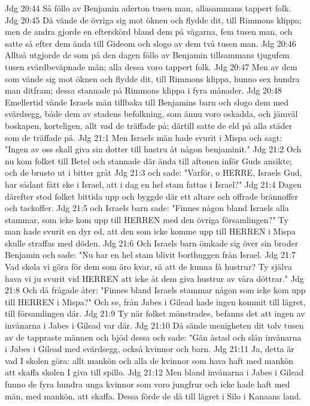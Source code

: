 Jdg 20:44  Så föllo av Benjamin aderton tusen man, allasammans tappert folk.
Jdg 20:45  Då vände de övriga sig mot öknen och flydde dit, till Rimmons klippa; men de andra gjorde en efterskörd bland dem på vägarna, fem tusen man, och satte så efter dem ända till Gideom och slogo av dem två tusen man.
Jdg 20:46  Alltså utgjorde de som på den dagen föllo av Benjamin tillsammans tjugufem tusen svärdbeväpnade män; alla dessa voro tappert folk.
Jdg 20:47  Men av dem som vände sig mot öknen och flydde dit, till Rimmons klippa, hunno sex hundra man ditfram; dessa stannade på Rimmons klippa i fyra månader.
Jdg 20:48  Emellertid vände Israels män tillbaka till Benjamins barn och slogo dem med svärdsegg, både dem av stadens befolkning, som ännu voro oskadda, och jämväl boskapen, korteligen, allt vad de träffade på; därtill satte de eld på alla städer som de träffade på.
Jdg 21:1  Men Israels män hade svurit i Mispa och sagt: "Ingen av oss skall giva sin dotter till hustru åt någon benjaminit."
Jdg 21:2  Och nu kom folket till Betel och stannade där ända till aftonen inför Guds ansikte; och de brusto ut i bitter gråt
Jdg 21:3  och sade: "Varför, o HERRE, Israels Gud, har sådant fått ske i Israel, att i dag en hel stam fattas i Israel?"
Jdg 21:4  Dagen därefter stod folket bittida upp och byggde där ett altare och offrade brännoffer och tackoffer.
Jdg 21:5  och Israels barn sade: "Finnes någon bland Israels alla stammar, som icke kom upp till HERREN med den övriga församlingen?" Ty man hade svurit en dyr ed, att den som icke komme upp till HERREN i Mispa skulle straffas med döden.
Jdg 21:6  Och Israels barn ömkade sig över sin broder Benjamin och sade: "Nu har en hel stam blivit borthuggen från Israel.
Jdg 21:7  Vad skola vi göra för dem som äro kvar, så att de kunna få hustrur? Ty själva hava vi ju svurit vid HERREN att icke åt dem giva hustrur av våra döttrar."
Jdg 21:8  Och då frågade åter: "Finnes bland Israels stammar någon som icke kom upp till HERREN i Mispa?" Och se, från Jabes i Gilead hade ingen kommit till lägret, till församlingen där.
Jdg 21:9  Ty när folket mönstrades, befanns det att ingen av invånarna i Jabes i Gilead var där.
Jdg 21:10  Då sände menigheten dit tolv tusen av de tappraste männen och bjöd dessa och sade: "Gån åstad och slån invånarna i Jabes i Gilead med svärdsegg, också kvinnor och barn.
Jdg 21:11  Ja, detta är vad I skolen göra: allt mankön och alla de kvinnor som hava haft med mankön att skaffa skolen I giva till spillo.
Jdg 21:12  Men bland invånarna i Jabes i Gilead funno de fyra hundra unga kvinnor som voro jungfrur och icke hade haft med män, med mankön, att skaffa. Dessa förde de då till lägret i Silo i Kanaans land.

